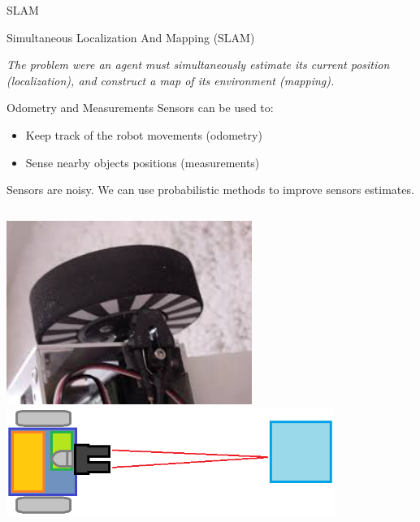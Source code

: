 \documentclass{beamer}
\begin{document}
\begin{frame}{SLAM}
\begin{block}{Simultaneous Localization And Mapping (SLAM)}
\begin{center}
\textit{
The problem were an agent must simultaneously estimate its current position (localization), and construct a map of its environment (mapping).}
\end{center}
\end{block}
\pause
\begin{block}{Odometry and Measurements}
Sensors can be used to:
\begin{itemize}
\item Keep track of the robot movements (odometry)
\item Sense nearby objects positions (measurements)
\end{itemize}
Sensors are noisy. We can use probabilistic methods to improve sensors estimates.
\end{block}
\begin{columns}
\includegraphics[width=0.6\textwidth]{img/encoders.jpg}
\centering
{}
\centering
\includegraphics[width=0.8\textwidth]{img/laser.png}
\end{columns}
\end{frame}
\end{document}
